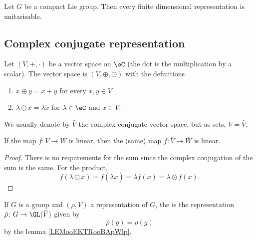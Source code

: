 \begin{proposition}     \label{PROPooCFRGooZBBype}
    Let $G$ be a compact Lie group. Then every finite dimensional representation is unitarisable.
\end{proposition}

\subsection{Complex conjugate representation}

\begin{definition}
    Let \( (V,+,\cdot)\) be a vector space on \( \eC\) (the dot is the multiplication by a scalar). The  vector space is \( (V,\oplus,\odot)\) with the definitions
    \begin{enumerate}
        \item
            \( x\oplus y=x+y\) for every \( x,y\in V\)
        \item
            \( \lambda\odot x=\bar \lambda\dot x\) for \( \lambda\in \eC\) and \( x\in V\).
    \end{enumerate}
    We usually denote by \( \bar V\) the complex conjugate vector space, but as sets, \( V=\bar V\).
\end{definition}

\begin{lemma}       \label{LEMooEKTRooBApWlp}
    If the map \( f\colon V\to W\) is linear, then the (same) map \( f\colon \bar V\to \bar W\) is linear.
\end{lemma}

\begin{proof}
    There is no requirements for the sum since the complex conjugation of the sum is the same. For the product,
    \begin{equation}
        f(\lambda\odot x)=f(\bar \lambda x)=\bar \lambda f(x)=\lambda\odot f(x).
    \end{equation}
\end{proof}

\begin{definition}
    If \( G\) is a group and \( (\rho, V)\) a representation of \( G\), the  is the representation \( \bar \rho\colon G\to \GL(\bar V)\) given by
    \begin{equation}
        \bar\rho(g)=\rho(g)
    \end{equation}
    by the lemma \ref{LEMooEKTRooBApWlp}.
\end{definition}

